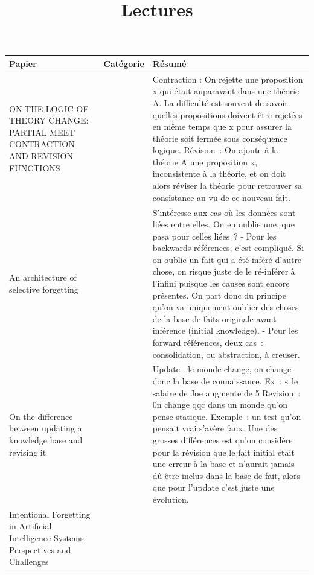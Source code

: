 \documentclass[french]{report}
\begin{document}
    \title{Lectures}
    \maketitle
    \begin{table}[h]
        \begin{center}
        \begin{tabular}{|p{}|p{}|p{}|}
            \hline
            Papier & Catégorie & Résumé \\
            \hline
            ON THE LOGIC OF THEORY CHANGE: PARTIAL MEET CONTRACTION AND REVISION FUNCTIONS \cite{alchourron_logic_1985}
            & 
            & Contraction : On rejette une proposition x qui était auparavant dans une théorie A. La difficulté est souvent de savoir quelles propositions doivent être rejetées en même temps que x pour assurer la théorie soit fermée sous conséquence logique. Révision : On ajoute à la théorie A une proposition x, inconsistente à la théorie, et on doit alors réviser la théorie pour retrouver sa consistance au vu de ce nouveau fait. \\
            \hline
            An architecture of selective forgetting \cite{euzenat_architecture_1991}
            &
            & S’intéresse aux cas où les données sont liées entre elles. On en oublie une, que pasa pour celles liées ?
            - Pour les backwards références, c’est compliqué. Si on oublie un fait qui a été inféré d’autre chose, on risque juste de le ré-inférer à l’infini puisque les causes sont encore présentes. On part donc du principe qu’on va uniquement oublier des choses de la base de faits originale avant inférence (initial knowledge).
            - Pour les forward références, deux cas : consolidation, ou abstraction, à creuser. \\
            \hline
            On the difference between updating a knowledge base and revising it \cite{gardenfors_belief_2003}
            &
            & Update : le monde change, on change donc la base de connaissance. Ex : « le salaire de Joe augmente de 5%
            Revision : 0n change qqc dans un monde qu’on pense statique. Exemple : un test qu’on pensait vrai s’avère faux.
            Une des grosses différences est qu’on considère pour la révision que le fait initial était une erreur à la base et n’aurait jamais dû être inclus dans la base de fait, alors que pour l’update c’est juste une évolution. \\
            \hline
            Intentional Forgetting in Artificial Intelligence Systems: Perspectives and Challenges \cite{timm_intentional_2018}

\end{tabular}
\end{center}
\end{table}
\end{document}
